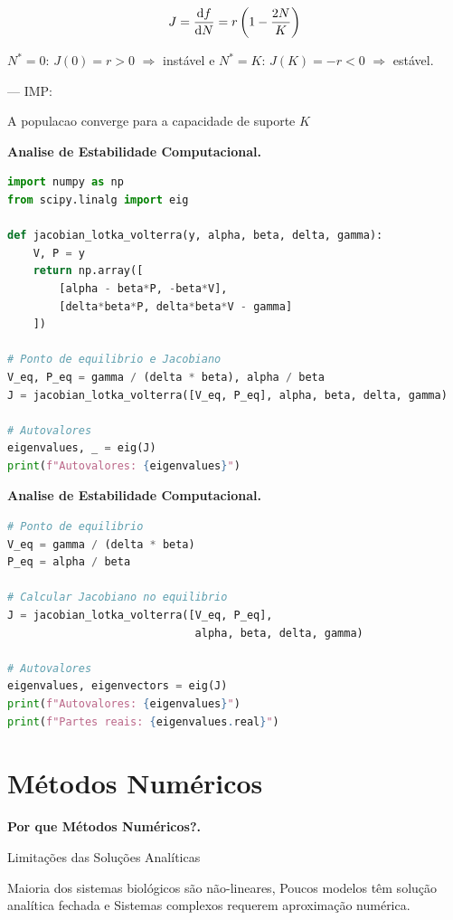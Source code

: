 %
\begin{equation*}
J = \frac{\mathrm{d} f}{\mathrm{d} N} = r\left(1 - \frac{2N}{K}\right)
\end{equation*}
%

$N^* = 0$: $J(0) = r > 0$ $\Rightarrow$ instável e $N^* = K$: $J(K) = -r < 0$ $\Rightarrow$ estável.

--- IMP: 

A populacao converge para a capacidade de suporte $K$

\textbf{Analise de Estabilidade Computacional.}

%
\begin{lstlisting}[language=Python, caption=Calculo do Jacobiano e autovalores, basicstyle=\ttfamily\footnotesize]
import numpy as np
from scipy.linalg import eig

def jacobian_lotka_volterra(y, alpha, beta, delta, gamma):
    V, P = y
    return np.array([
        [alpha - beta*P, -beta*V],
        [delta*beta*P, delta*beta*V - gamma]
    ])

# Ponto de equilibrio e Jacobiano
V_eq, P_eq = gamma / (delta * beta), alpha / beta
J = jacobian_lotka_volterra([V_eq, P_eq], alpha, beta, delta, gamma)

# Autovalores
eigenvalues, _ = eig(J)
print(f"Autovalores: {eigenvalues}")
\end{lstlisting}
%

\textbf{Analise de Estabilidade Computacional.}

%
\begin{lstlisting}[language=Python, caption=Analise de autovalores]
# Ponto de equilibrio
V_eq = gamma / (delta * beta)
P_eq = alpha / beta

# Calcular Jacobiano no equilibrio
J = jacobian_lotka_volterra([V_eq, P_eq],
                             alpha, beta, delta, gamma)

# Autovalores
eigenvalues, eigenvectors = eig(J)
print(f"Autovalores: {eigenvalues}")
print(f"Partes reais: {eigenvalues.real}")
\end{lstlisting}
%

\section{Métodos Numéricos}

\textbf{Por que Métodos Numéricos?.}

Limitações das Soluções Analíticas

Maioria dos sistemas biológicos são não-lineares, Poucos modelos têm solução analítica fechada e Sistemas complexos requerem aproximação numérica.

